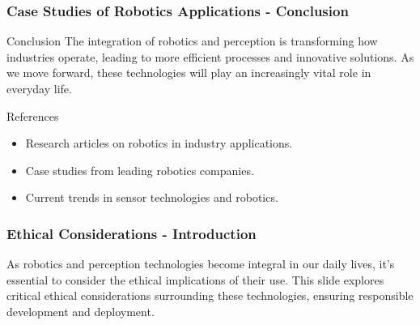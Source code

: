 \documentclass{beamer}
\begin{document}
\begin{frame}[fragile]
    \frametitle{Case Studies of Robotics Applications - Conclusion}
    \begin{block}{Conclusion}
        The integration of robotics and perception is transforming how industries operate, leading to more efficient processes and innovative solutions.
        As we move forward, these technologies will play an increasingly vital role in everyday life.
    \end{block}
    \begin{block}{References}
        \begin{itemize}
            \item Research articles on robotics in industry applications.
            \item Case studies from leading robotics companies.
            \item Current trends in sensor technologies and robotics.
        \end{itemize}
    \end{block}
\end{frame}

\begin{frame}[fragile]
    \frametitle{Ethical Considerations - Introduction}
    As robotics and perception technologies become integral in our daily lives, it's essential to consider the ethical implications of their use. This slide explores critical ethical considerations surrounding these technologies, ensuring responsible development and deployment.
\end{frame}
\end{document}
